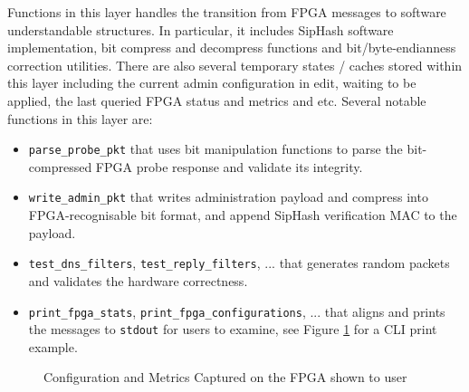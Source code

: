 \documentclass[a4paper]{report}
\newcommand{\code}{\texttt}
\begin{document}
Functions in this layer handles the transition from FPGA messages to software understandable structures. In particular, it includes SipHash software implementation, bit compress and decompress functions and bit/byte-endianness correction utilities. There are also several temporary states / caches stored within this layer including the current admin configuration in edit, waiting to be applied, the last queried FPGA status and metrics and etc. Several notable functions in this layer are:
\begin{itemize}
    \item \code{parse\_probe\_pkt} that uses bit manipulation functions to parse the bit-compressed FPGA probe response and validate its integrity.
    \item \code{write\_admin\_pkt} that writes administration payload and compress into FPGA-recognisable bit format, and append SipHash verification MAC to the payload.
    \item \code{test\_dns\_filters}, \code{test\_reply\_filters}, ... that generates random packets and validates the hardware correctness.
    \item \code{print\_fpga\_stats}, \code{print\_fpga\_configurations}, ... that aligns and prints the messages to \code{stdout} for users to examine, see Figure \ref{fig:console-screenshot} for a CLI print example.
\end{itemize}

\begin{figure}[h!]
  \caption{Configuration and Metrics Captured on the FPGA shown to user}
  \label{fig:console-screenshot}
\end{figure}
\end{document}
